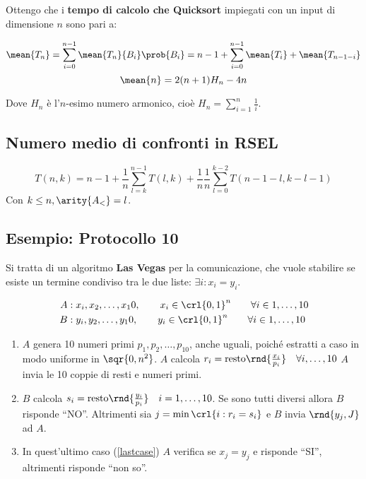 \documentclass[\main/main.tex]{subfiles}
\begin{document}
Ottengo che i \textbf{tempo di calcolo che Quicksort} impiegati con un input di dimensione \(n\) sono pari a:

\[
	\mean{T_n} = \sum_{i = 0}^{n-1} \mean{T_n}{B_i} \prob{B_i} = n-1 + \sum_{i = 0}^{n-1} \mean{T_i} + \mean{T_{n-1-i}}
\]
\[
	\mean{n} = 2(n+1)H_n - 4n
\]

Dove \(H_n\) è l'\(n\)-esimo numero armonico, cioè \(H_n = \sum_{i=1}^n \frac{1}{i}\).

\subsection{Numero medio di confronti in RSEL}
\[
	T(n,k) = n-1 + \frac{1}{n}\sum_{l=k}^{n-1} T(l,k) + \frac{1}{n} \frac{1}{n}\sum_{l=0}^{k-2} T(n-1-l, k-l-1)
\]
Con \(k\leq n, \arity{A_<} = l\).

\subsection{Esempio: Protocollo 10}
Si tratta di un algoritmo \textbf{Las Vegas} per la comunicazione, che vuole stabilire se esiste un termine condiviso tra le due liste: \(\exists i: x_i = y_i\).

\begin{align*}
	A & : x_i, x_2, \ldots, x_10, \qquad x_i \in \crl{0,1}^n \qquad \forall i \in 1, \ldots, 10 \\
	B & : y_i, y_2, \ldots, y_10, \qquad y_i \in \crl{0,1}^n \qquad \forall i \in 1, \ldots, 10
\end{align*}

\begin{enumerate}
	\item \(A\) genera 10 numeri primi \(p_1, p_2, \ldots, p_10\), anche uguali, poiché estratti a caso in modo uniforme in \(\sqr{0, n^2}\).
	      \subitem \(A\) calcola \(r_i = \text{resto}\rnd{\frac{x_i}{p_i}} \quad \forall i, \ldots, 10\)
	      \subitem \(A\) invia le 10 coppie di resti e numeri primi.
	\item \(B\) calcola \(s_i = \text{resto}\rnd{\frac{y_i}{p_i}} \quad i = 1, \ldots, 10\).
	      \subitem Se sono tutti diversi allora \(B\) risponde ``NO''.
	      \subitem Altrimenti sia \(j=\min\crl{i: r_i = s_i}\) e \(B\) invia \(\rnd{y_j, J}\) ad \(A\). \label{lastcase}
	\item In quest'ultimo caso (\ref{lastcase}) \(A\) verifica se \(x_j = y_j\) e risponde ``SI'', altrimenti risponde ``non so''.
\end{enumerate}
\end{document}
